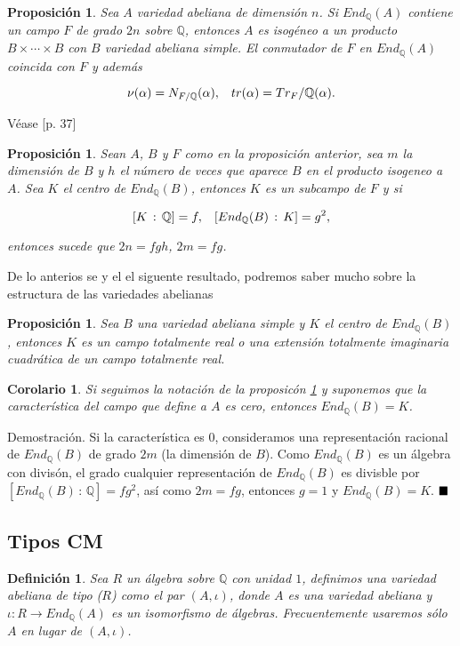 \documentclass[letterpaper]{report}
\newtheorem{prop}[teorema]{Proposici\'on}
\newtheorem{cor}[teorema]{Corolario}
\newtheorem{def.}{Definici\'on}[chapter]
\newcommand{\dem}{{\sc Demostraci\'on. }}
\newcommand{\rac}{\ensuremath{ \mathbb Q }}
\newcommand{\qed}{\ensuremath{\hspace*{0em plus 1fill}\blacksquare}}
\begin{document}
\begin{prop}\label{prop3}
Sea $A$ variedad abeliana de dimensión $n$. Si $End_{\rac}(A)$ contiene un campo $F$ de grado $2n$ sobre $\rac$, entonces $A$ es isogéneo a un producto \hbox{$B\times\cdots\times B$} con $B$ variedad abeliana simple. El conmutador de $F$ en $End_{\rac}(A)$ coincida con $F$ y además

$$\nu(\alpha)=N_{F/\rac}(\alpha),\hspace{0.3cm}tr(\alpha)=Tr_F/\rac(\alpha).$$
\end{prop}
\noindent Véase \cite{shimura}[p. 37]
\begin{prop}\label{prop4}
Sean $A$, $B$ y $F$ como en la proposición anterior, sea $m$ la dimensión de $B$ y $h$ el número de veces que aparece $B$ en el producto isogeneo a $A$. Sea $K$ el centro de $End_{\rac}(B)$, entonces $K$ es un subcampo de $F$ y si 

$$[K\,:\,\rac]=f,\hspace{0.3cm}[End_{\rac}(B)\,:\,K]=g^2,$$

\noindent  entonces sucede que $2n=fgh$, $2m=fg$.
\end{prop}
De lo anterios se y el el siguente resultado, podremos saber mucho sobre la estructura de las variedades abelianas
\begin{prop}\label{prop5}
Sea $B$ una variedad abeliana simple y $K$ el centro de $End_{\rac}(B)$, entonces $K$ es un campo totalmente real o una extensión totalmente imaginaria cuadrática de un campo totalmente real.
\end{prop}
\begin{cor} Si seguimos la notación de la proposicón \ref{prop4} y suponemos que la característica del campo que define a $A$ es cero, entonces $End_{\rac}(B)=K$.
\end{cor}
\dem Si la característica es $0$, consideramos una representación racional de $End_{\rac}(B)$ de grado $2m$ (la dimensión de $B$). Como $End_{\rac}(B)$ es un álgebra con divisón, el grado cualquier representación de $End_{\rac}(B)$ es divisble por $[End_{\rac}(B)\,:\,\rac]=fg^2$, así como $2m=fg$, entonces $g=1$ y $End_{\rac}(B)=K$. \qed

\subsection*{Tipos CM}
\begin{def.}
Sea $R$ un álgebra sobre $\rac$ con unidad $1$, definimos una variedad abeliana de tipo ($R$) como el par $(A,\iota)$, donde $A$  es una variedad abeliana y $\iota:R\rightarrow End_{\rac}(A)$ es un isomorfismo de álgebras. Frecuentemente usaremos sólo $A$ en lugar de $(A,\iota)$.
\end{def.}
\end{document}
